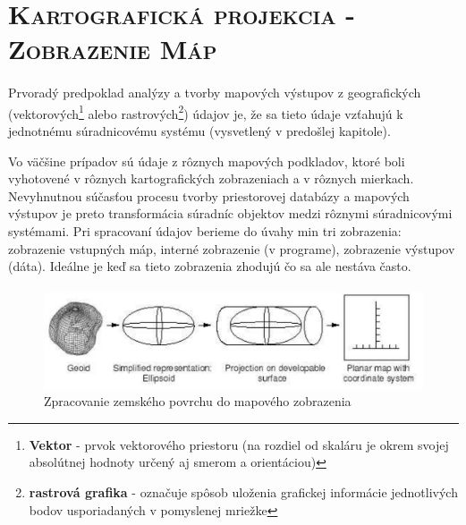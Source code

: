 \paragraph{}\paragraph{}\paragraph{}%
\section{\textsc{Kartografická projekcia - Zobrazenie Máp}}
\paragraph{}
Prvoradý predpoklad analýzy a tvorby mapových výstupov z geografických
(vektorových\footnote{\textbf{Vektor} - prvok vektorového priestoru (na rozdiel od skaláru je okrem svojej absolútnej hodnoty určený aj smerom a orientáciou)} alebo rastrových\footnote{\textbf{rastrová grafika} - označuje spôsob uloženia grafickej informácie jednotlivých bodov usporiadaných v pomyslenej mriežke}) údajov je, že sa tieto údaje vzťahujú k jednotnému
súradni\-co\-vé\-mu systému (vysvetlený v predošlej kapitole).

Vo väčšine prípadov sú údaje z rôznych mapových podkladov, ktoré boli vyhotovené
v rôznych kartografických zobrazeniach a v rôznych mierkach. Nevyhnutnou
súčasťou procesu tvorby priestorovej databázy a mapových výstupov je preto
transformácia súradníc objektov medzi rôznymi súradnicovými systémami.
Pri spracovaní údajov berieme do úvahy min tri zobrazenia:
zobrazenie vstupných máp, interné zobrazenie (v programe), zobrazenie výstupov (dáta).
Ideálne je keď sa tieto zobrazenia zhodujú čo sa ale nestáva často.

\paragraph{}
\begin{figure}[ht]
\centering
\includegraphics[width=14.5cm]{obr/zem_do_mapy}
\caption{Zpracovanie zemského povrchu do mapového zobrazenia}
\end{figure}

